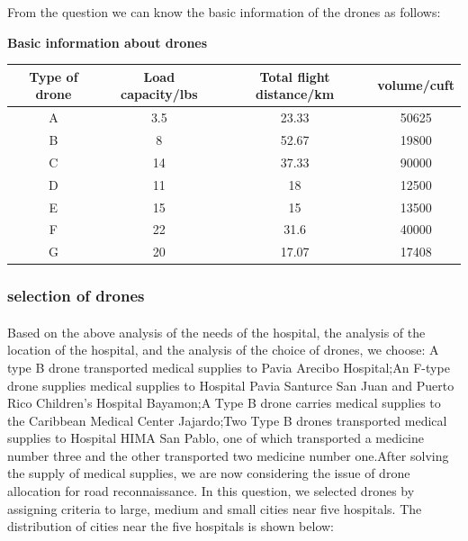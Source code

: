 \documentclass{article} %
\begin{document}
From the question we can know the basic information of the drones as follows:


\centerline{\textbf {Basic information about drones}}
\begin{table}[h]
\begin{tabular}{cccc}
\hline
\textbf{Type of drone} & \textbf{Load capacity/lbs} & \textbf{Total flight distance/km} & \textbf{volume/cuft} \\ \hline
A         &          3.5& 23.33       & 50625        \\  \hline
B            &         8 & 52.67        & 19800        \\  \hline
C         &          14& 37.33              &90000                   \\   \hline
D         & 11        & 18              & 12500                 \\   \hline
E       &          15& 15            &    13500               \\ \hline
F         &       22 & 31.6              &  40000                \\ \hline
G         &       20&   17.07            &     17408             \\  
\hline
\end{tabular}
\end{table}  
\subsubsection{selection of drones} 
\paragraph{}Based on the above analysis of the needs of the hospital, the analysis of the location of the hospital, and the analysis of the choice of drones, we choose:
A type B drone transported medical supplies to Pavia Arecibo Hospital;An F-type drone supplies medical supplies to Hospital Pavia Santurce San Juan and Puerto Rico Children's Hospital Bayamon;A Type B drone carries medical supplies to the Caribbean Medical Center Jajardo;Two Type B drones transported medical supplies to Hospital HIMA San Pablo, one of which transported a medicine number three and the other transported two medicine number one.After solving the supply of medical supplies, we are now considering the issue of drone allocation for road reconnaissance.
In this question, we selected drones by assigning criteria to large, medium and small cities near five hospitals.
The distribution of cities near the five hospitals is shown below:
\end{document}
